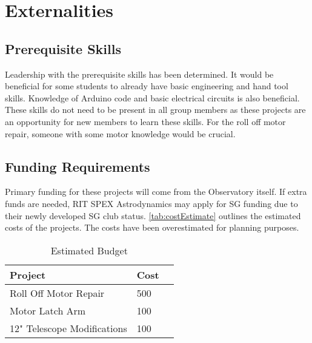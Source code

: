 \documentclass[conference]{IEEEtran} %
\begin{document}
\section{Externalities}
\subsection{Prerequisite Skills}
  Leadership with the prerequisite skills has been determined.
  It would be beneficial for some students to already have basic engineering and hand tool skills.
  Knowledge of Arduino code and basic electrical circuits is also beneficial.
  These skills do not need to be present in all group members as these projects are an opportunity for new members to learn these skills.
  For the roll off motor repair, someone with some motor knowledge would be crucial.

\subsection{Funding Requirements}
  Primary funding for these projects will come from the Observatory itself.
  If extra funds are needed, RIT SPEX Astrodynamics may apply for SG funding due to their newly developed SG club status.
  \autoref{tab:costEstimate} outlines the estimated costs of the projects.
  The costs have been overestimated for planning purposes.

  \begin{table}[hb!]
        \caption{Estimated Budget}
        \centering
        \begin{tabularx}{\linewidth}{lXl}
            \toprule %
            Project & Cost \\
            \midrule %
            Roll Off Motor Repair & 500 \\
            Motor Latch Arm & 100 \\
            12" Telescope Modifications & 100 \\
            \bottomrule
        \end{tabularx}
    \label{tab:costEstimate}
    \end{table}
\end{document}
